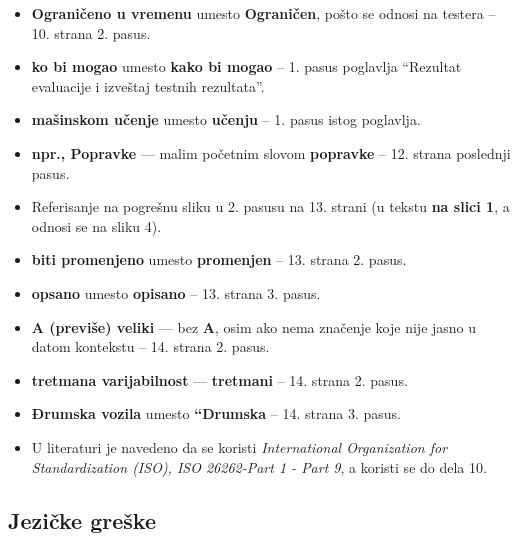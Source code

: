 \documentclass[a4paper]{report}
\begin{document}
\begin{itemize}
\item {\bf{Ograničeno u vremenu}} umesto {\bf{Ograničen}}, pošto se odnosi na testera -- 10. strana 2. pasus.
\item {\bf{ko bi mogao}} umesto {\bf{kako bi mogao}} -- 1. pasus poglavlja ``Rezultat evaluacije i izveštaj testnih rezultata''.
\item {\bf{mašinskom učenje}} umesto {\bf{učenju}} -- 1. pasus istog poglavlja.
\item {\bf{npr., Popravke}} --- malim početnim slovom {\bf{popravke}} -- 12. strana poslednji pasus.
\item Referisanje na pogrešnu sliku u 2. pasusu na 13. strani (u tekstu {\bf{na slici 1}}, a odnosi se na sliku 4).
\item {\bf{biti promenjeno}} umesto {\bf{promenjen}} -- 13. strana 2. pasus.
\item {\bf{opsano}} umesto {\bf{opisano}} -- 13. strana 3. pasus.
\item {\bf{A (previše) veliki}} --- bez {\bf{A}}, osim ako nema značenje koje nije jasno u datom kontekstu -- 14. strana 2. pasus.
\item {\bf{tretmana varijabilnost}} --- {\bf{tretmani}} -- 14. strana 2. pasus.
\item {\bf{Đrumska vozila}} umesto {\bf{``Drumska}} -- 14. strana 3. pasus.
\item U literaturi je navedeno da se koristi {\em{International Organization for Standardization (ISO), ISO 26262-Part 1 - Part 9}}, a koristi se do dela 10.
\end{itemize}


\subsection{Jezičke greške}
\end{document}
